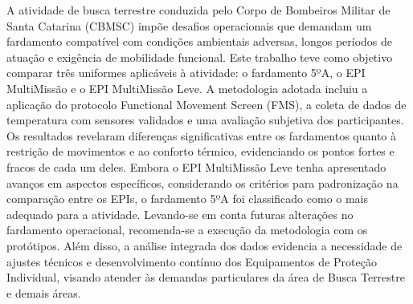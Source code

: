 A atividade de busca terrestre conduzida pelo Corpo de Bombeiros Militar de Santa Catarina (CBMSC) impõe desafios operacionais 
que demandam um fardamento compatível com condições ambientais adversas, longos períodos de atuação e exigência de mobilidade 
funcional. Este trabalho teve como objetivo comparar três uniformes aplicáveis à atividade: o fardamento 5ºA, o EPI MultiMissão 
e o EPI MultiMissão Leve. A metodologia adotada incluiu a aplicação do protocolo Functional Movement Screen (FMS), a coleta de 
dados de temperatura com sensores validados e uma avaliação subjetiva dos participantes. Os resultados revelaram diferenças 
significativas entre os fardamentos quanto à restrição de movimentos e ao conforto térmico, evidenciando os pontos fortes e fracos 
de cada um deles. Embora o EPI MultiMissão Leve tenha apresentado avanços em aspectos específicos, considerando os critérios para padronização na comparação entre os EPIs, o fardamento 
5ºA foi classificado como o mais adequado para a atividade. Levando-se em conta futuras alterações no fardamento operacional, 
recomenda-se a execução da metodologia com os protótipos. Além disso, a análise integrada dos dados evidencia a necessidade de ajustes 
técnicos e desenvolvimento contínuo dos Equipamentos de Proteção Individual, visando atender às demandas particulares da área 
de Busca Terrestre e demais áreas.
